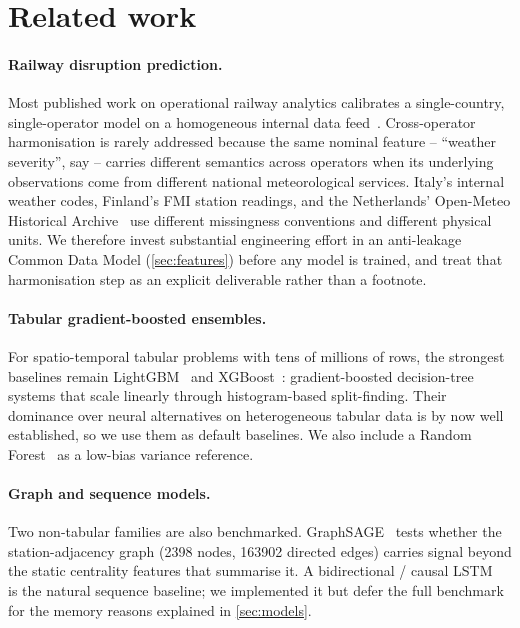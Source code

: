\section{Related work}
\label{sec:related-work}

\paragraph{Railway disruption prediction.} Most published work on operational railway analytics calibrates a single-country, single-operator model on a homogeneous internal data feed~\cite{gerum2024railway}. Cross-operator harmonisation is rarely addressed because the same nominal feature -- ``weather severity'', say -- carries different semantics across operators when its underlying observations come from different national meteorological services. Italy's internal weather codes, Finland's FMI station readings, and the Netherlands' Open-Meteo Historical Archive~\cite{zippenfenig2023openmeteo} use different missingness conventions and different physical units. We therefore invest substantial engineering effort in an anti-leakage Common Data Model (\cref{sec:features}) before any model is trained, and treat that harmonisation step as an explicit deliverable rather than a footnote.

\paragraph{Tabular gradient-boosted ensembles.} For spatio-temporal tabular problems with tens of millions of rows, the strongest baselines remain LightGBM~\cite{ke2017lightgbm} and XGBoost~\cite{chen2016xgboost}: gradient-boosted decision-tree systems that scale linearly through histogram-based split-finding. Their dominance over neural alternatives on heterogeneous tabular data is by now well established, so we use them as default baselines. We also include a Random Forest~\cite{breiman2001random} as a low-bias variance reference.

\paragraph{Graph and sequence models.} Two non-tabular families are also benchmarked. GraphSAGE~\cite{hamilton2017inductive} tests whether the station-adjacency graph (\num{2398} nodes, \num{163902} directed edges) carries signal beyond the static centrality features that summarise it. A bidirectional / causal LSTM~\cite{schuster1997bidirectional,hochreiter1997long} is the natural sequence baseline; we implemented it but defer the full benchmark for the memory reasons explained in \cref{sec:models}.


